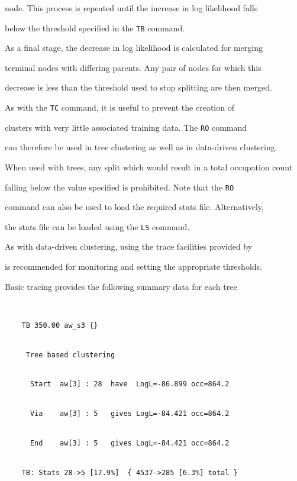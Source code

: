 node.  This process is repeated until the increase in log likelihood falls


below the threshold specified in the \texttt{TB} command.


As a final stage, the decrease in log likelihood is calculated for merging


terminal nodes with differing parents.  Any pair of nodes for which this


decrease is less than the threshold used to stop splitting are then merged.







As with the \texttt{TC} command, it is useful to prevent the creation of


clusters with very little associated training data.  The \texttt{RO} command


can therefore be used in tree clustering as well as in data-driven clustering.


When used with trees, any split which would result in a total occupation count


falling below the value specified is prohibited.  Note that the \texttt{RO}


command can also be used to load the required stats file.  Alternatively,


the stats file can be loaded using the \texttt{LS} command.





As with data-driven clustering, using the trace facilities provided by


 is recommended for monitoring and setting the appropriate thresholds.


Basic tracing provides the following summary data for each tree


\begin{verbatim}


    TB 350.00 aw_s3 {}


     Tree based clustering


      Start  aw[3] : 28  have  LogL=-86.899 occ=864.2


      Via    aw[3] : 5   gives LogL=-84.421 occ=864.2


      End    aw[3] : 5   gives LogL=-84.421 occ=864.2


    TB: Stats 28->5 [17.9%]  { 4537->285 [6.3%] total }


\end{verbatim}


